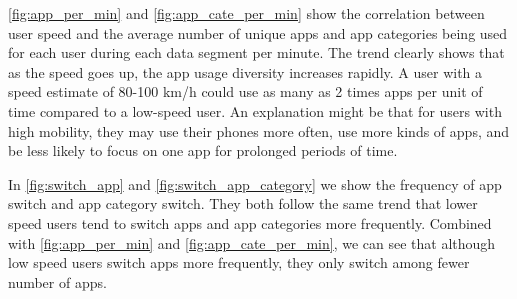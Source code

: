 
\autoref{fig:app_per_min} and \autoref{fig:app_cate_per_min} 
show the correlation between user speed and the average number of unique apps and app categories being used for each user during each data segment per minute.
The trend clearly shows that as the speed goes up, the app usage diversity increases rapidly.
A user with a speed estimate of 80-100 km/h could use as many as 2 times apps per unit of time compared to a low-speed user.
An explanation might be that for users with high mobility, they may use their phones more often, use more kinds of apps, and be less likely to focus on one app for prolonged periods of time. 


In 
\autoref{fig:switch_app} and \autoref{fig:switch_app_category} 
we show the frequency of app switch and app category switch. They both follow the same trend that lower speed users tend to switch apps and app categories more frequently. Combined with 
\autoref{fig:app_per_min} and \autoref{fig:app_cate_per_min}, %
we can see that although low speed users switch apps more frequently, they only switch among fewer number of apps.

